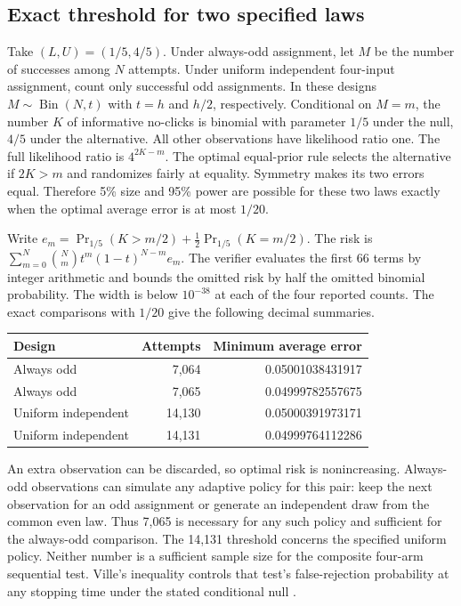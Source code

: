 \documentclass[11pt,letterpaper]{article}
\begin{document}
\subsection*{Exact threshold for two specified laws}
Take $(L,U)=(1/5,4/5)$. Under always-odd assignment, let $M$ be the number of successes among $N$ attempts. Under uniform independent four-input assignment, count only successful odd assignments. In these designs $M\sim\operatorname{Bin}(N,t)$ with $t=h$ and $h/2$, respectively. Conditional on $M=m$, the number $K$ of informative no-clicks is binomial with parameter $1/5$ under the null, $4/5$ under the alternative. All other observations have likelihood ratio one. The full likelihood ratio is $4^{2K-m}$. The optimal equal-prior rule selects the alternative if $2K>m$ and randomizes fairly at equality. Symmetry makes its two errors equal. Therefore 5\% size and 95\% power are possible for these two laws exactly when the optimal average error is at most $1/20$.

Write $e_m=\Pr_{1/5}(K>m/2)+\tfrac12\Pr_{1/5}(K=m/2)$. The risk is $\sum_{m=0}^N{N\choose m}t^m(1-t)^{N-m}e_m$. The verifier evaluates the first 66 terms by integer arithmetic and bounds the omitted risk by half the omitted binomial probability. The width is below $10^{-38}$ at each of the four reported counts. The exact comparisons with $1/20$ give the following decimal summaries.
\begin{center}\small\begin{tabular}{@{}lrr@{}}\toprule
Design & Attempts & Minimum average error\\\midrule
Always odd & 7,064 & 0.05001038431917\\
Always odd & 7,065 & 0.04999782557675\\
Uniform independent & 14,130 & 0.05000391973171\\
Uniform independent & 14,131 & 0.04999764112286\\\bottomrule
\end{tabular}\end{center}
An extra observation can be discarded, so optimal risk is nonincreasing. Always-odd observations can simulate any adaptive policy for this pair: keep the next observation for an odd assignment or generate an independent draw from the common even law. Thus 7,065 is necessary for any such policy and sufficient for the always-odd comparison. The 14,131 threshold concerns the specified uniform policy. Neither number is a sufficient sample size for the composite four-arm sequential test. Ville's inequality controls that test's false-rejection probability at any stopping time under the stated conditional null \cite{wills}.
\end{document}
